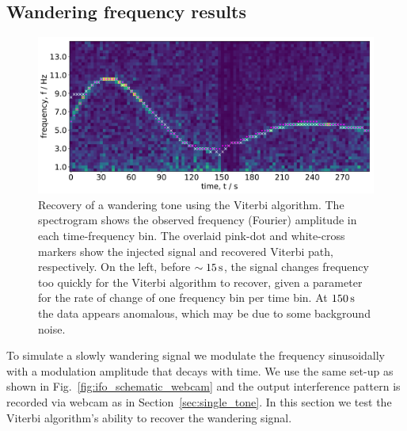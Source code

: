 \documentclass[paper-main.tex]{subfiles}
\begin{document}
\subsection{Wandering frequency results}
\label{sec:wanderingResults}

\begin{figure}
	\includegraphics[width=\textwidth]{figures/expt_overlay_2_viterbi_test_webcam.pdf}
	\caption{\label{fig:viterbi_overlay}
Recovery of a wandering tone using the Viterbi algorithm. 
The spectrogram shows the observed frequency (Fourier) amplitude in each time-frequency bin. 
The overlaid pink-dot and white-cross markers show the injected signal and recovered Viterbi path, respectively. 
On the left, before $\sim 15\,{\rm s}$, the signal changes frequency too quickly for the Viterbi algorithm to recover, given a parameter for the rate of change of one frequency bin per time bin. 
At $150\,{\rm s}$ the data appears anomalous, which may be due to some background noise. }
\end{figure}
 

To simulate a slowly wandering signal we modulate the frequency sinusoidally with a modulation amplitude that decays with time. 
We use the same set-up as shown in Fig.~\ref{fig:ifo_schematic_webcam} and the output interference pattern is recorded via webcam as in Section~\ref{sec:single_tone}. 
In this section we test the Viterbi algorithm’s ability to recover the wandering signal.
\end{document}

